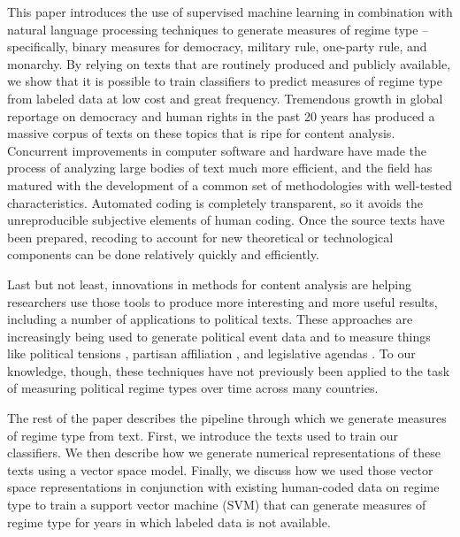 \documentclass[pdftex,12pt,fullpage,oneside]{amsart}
\begin{document}
This paper introduces the use of supervised machine learning in combination with natural language processing techniques to generate measures of regime type -- specifically, binary measures for democracy, military rule, one-party rule, and monarchy. By relying on texts that are routinely produced and publicly available, we show that it is possible to train classifiers to predict measures of regime type from labeled data at low cost and great frequency. Tremendous growth in global reportage on democracy and human rights in the past 20 years has produced a massive corpus of texts on these topics that is ripe for content analysis. Concurrent improvements in computer software and hardware have made the process of analyzing large bodies of text much more efficient, and the field has matured with the development of a common set of methodologies with well-tested characteristics. Automated coding is completely transparent, so it avoids the unreproducible subjective elements of human coding. Once the source texts have been prepared, recoding to account for new theoretical or technological components can be done relatively quickly and efficiently. 

Last but not least, innovations in methods for content analysis are helping researchers use those tools to produce more interesting and more useful results, including a number of applications to political texts. These approaches are increasingly being used to generate political event data \citep{dorazio:etal:2014,king:lowe:2003,oconnor:etal:2013} and to measure things like political tensions \citep{chadefaux:2014}, partisan affiliation \citep{lo:etal:2014,yu:etal:2008,laver:etal:2003}, and legislative agendas \citep{grimmer:2010}. To our knowledge, though, these techniques have not previously been applied to the task of measuring political regime types over time across many countries. 

The rest of the paper describes the pipeline through which we generate measures of regime type from text. First, we introduce the texts used to train our classifiers. We then describe how we generate numerical representations of these texts using a vector space model. Finally, we discuss how we used those vector space representations in conjunction with existing human-coded data on regime type to train a support vector machine (SVM) that can generate measures of regime type for years in which labeled data is not available.
\end{document}
